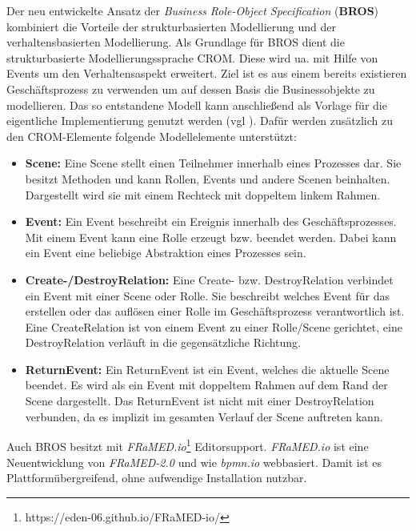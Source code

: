 Der neu entwickelte Ansatz der \emph{Business Role-Object Specification} (\textbf{BROS}) kombiniert die Vorteile der strukturbasierten Modellierung und der verhaltensbasierten Modellierung.
Als Grundlage für BROS dient die strukturbasierte Modellierungssprache CROM.
Diese wird ua. mit Hilfe von Events um den Verhaltensaspekt erweitert.
Ziel ist es aus einem bereits existieren Geschäftsprozess zu verwenden um auf dessen Basis die Businessobjekte zu modellieren.
Das so entstandene Modell kann anschließend als Vorlage für die eigentliche Implementierung genutzt werden (vgl \cite{Schoen}).
Dafür werden zusätzlich zu den CROM-Elemente folgende Modellelemente unterstützt:

\begin{itemize}
    \item \textbf{Scene:}
    Eine Scene stellt einen Teilnehmer innerhalb eines Prozesses dar.
    Sie besitzt Methoden und kann Rollen, Events und andere Scenen beinhalten.
    Dargestellt wird sie mit einem Rechteck mit doppeltem linkem Rahmen.
    \item \textbf{Event:}
    Ein Event beschreibt ein Ereignis innerhalb des Geschäftsprozesses.
    Mit einem Event kann eine Rolle erzeugt bzw. beendet werden.
    Dabei kann ein Event eine beliebige Abstraktion eines Prozesses sein.
    \item \textbf{Create-/DestroyRelation:}
    Eine Create- bzw. DestroyRelation verbindet ein Event mit einer Scene oder Rolle.
    Sie beschreibt welches Event für das erstellen oder das auflösen einer Rolle im Geschäftsprozess verantwortlich ist.
    Eine CreateRelation ist von einem Event zu einer Rolle/Scene gerichtet, eine DestroyRelation verläuft in die gegensätzliche Richtung.
    \item \textbf{ReturnEvent:}
    Ein ReturnEvent ist ein Event, welches die aktuelle Scene beendet.
    Es wird als ein Event mit doppeltem Rahmen auf dem Rand der Scene dargestellt.
    Das ReturnEvent ist nicht mit einer DestroyRelation verbunden, da es implizit im gesamten Verlauf der Scene auftreten kann.
\end{itemize}

Auch BROS besitzt mit \emph{FRaMED.io}\footnote{https://eden-06.github.io/FRaMED-io/} Editorsupport.
\emph{FRaMED.io} ist eine Neuentwicklung von \emph{FRaMED-2.0} und wie \emph{bpmn.io} webbasiert.
Damit ist es Plattformübergreifend, ohne aufwendige Installation nutzbar.

